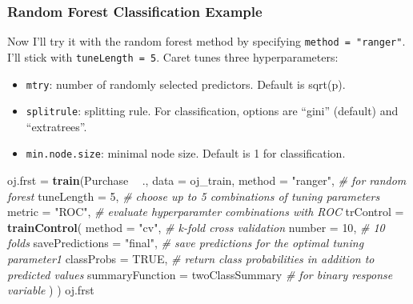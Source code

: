 \documentclass[
]{book}
\newenvironment{Shaded}{\begin{snugshade}}{\end{snugshade}}
\newcommand{\CommentTok}[1]{\textcolor[rgb]{0.56,0.35,0.01}{\textit{#1}}}
\newcommand{\DataTypeTok}[1]{\textcolor[rgb]{0.13,0.29,0.53}{#1}}
\newcommand{\DecValTok}[1]{\textcolor[rgb]{0.00,0.00,0.81}{#1}}
\newcommand{\KeywordTok}[1]{\textcolor[rgb]{0.13,0.29,0.53}{\textbf{#1}}}
\newcommand{\NormalTok}[1]{#1}
\newcommand{\OperatorTok}[1]{\textcolor[rgb]{0.81,0.36,0.00}{\textbf{#1}}}
\newcommand{\OtherTok}[1]{\textcolor[rgb]{0.56,0.35,0.01}{#1}}
\newcommand{\StringTok}[1]{\textcolor[rgb]{0.31,0.60,0.02}{#1}}
\providecommand{\tightlist}{%
  \setlength{\itemsep}{0pt}\setlength{\parskip}{0pt}}
\begin{document}
\hypertarget{random-forest-classification-example}{%
\subsubsection{Random Forest Classification Example}\label{random-forest-classification-example}}

Now I'll try it with the random forest method by specifying \texttt{method\ =\ "ranger"}. I'll stick with \texttt{tuneLength\ =\ 5}. Caret tunes three hyperparameters:

\begin{itemize}
\tightlist
\item
  \texttt{mtry}: number of randomly selected predictors. Default is sqrt(p).
\item
  \texttt{splitrule}: splitting rule. For classification, options are ``gini'' (default) and ``extratrees''.
\item
  \texttt{min.node.size}: minimal node size. Default is 1 for classification.
\end{itemize}

\begin{Shaded}
\begin{Highlighting}[]
\NormalTok{oj.frst =}\StringTok{ }\KeywordTok{train}\NormalTok{(Purchase }\OperatorTok{~}\StringTok{ }\NormalTok{., }
               \DataTypeTok{data =}\NormalTok{ oj_train, }
               \DataTypeTok{method =} \StringTok{"ranger"}\NormalTok{,  }\CommentTok{# for random forest}
               \DataTypeTok{tuneLength =} \DecValTok{5}\NormalTok{,  }\CommentTok{# choose up to 5 combinations of tuning parameters}
               \DataTypeTok{metric =} \StringTok{"ROC"}\NormalTok{,  }\CommentTok{# evaluate hyperparamter combinations with ROC}
               \DataTypeTok{trControl =} \KeywordTok{trainControl}\NormalTok{(}
                 \DataTypeTok{method =} \StringTok{"cv"}\NormalTok{,  }\CommentTok{# k-fold cross validation}
                 \DataTypeTok{number =} \DecValTok{10}\NormalTok{,  }\CommentTok{# 10 folds}
                 \DataTypeTok{savePredictions =} \StringTok{"final"}\NormalTok{,       }\CommentTok{# save predictions for the optimal tuning parameter1}
                 \DataTypeTok{classProbs =} \OtherTok{TRUE}\NormalTok{,  }\CommentTok{# return class probabilities in addition to predicted values}
                 \DataTypeTok{summaryFunction =}\NormalTok{ twoClassSummary  }\CommentTok{# for binary response variable}
\NormalTok{                 )}
\NormalTok{               )}
\NormalTok{oj.frst}
\end{Highlighting}
\end{Shaded}
\end{document}
